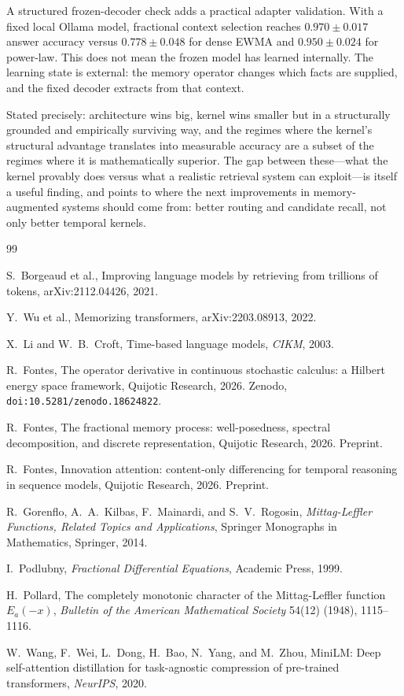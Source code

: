 \documentclass[11pt]{article}
\theoremstyle{plain}
\theoremstyle{definition}
\begin{document}
A structured frozen-decoder check adds a practical
adapter validation.  With a fixed local Ollama model,
fractional context selection reaches $0.970\pm0.017$
answer accuracy versus $0.778\pm0.048$ for dense EWMA
and $0.950\pm0.024$ for power-law.  This does not mean
the frozen model has learned internally.  The learning
state is external: the memory operator changes which
facts are supplied, and the fixed decoder extracts from
that context.

Stated precisely: architecture wins big, kernel wins
smaller but in a structurally grounded and empirically
surviving way, and the regimes where the kernel's
structural advantage translates into measurable accuracy
are a subset of the regimes where it is mathematically
superior.  The gap between these---what the kernel
provably does versus what a realistic retrieval system can
exploit---is itself a useful finding, and points to where
the next improvements in memory-augmented systems should
come from: better routing and candidate recall, not only
better temporal kernels.


\begin{thebibliography}{99}

S.~Borgeaud et al., Improving language models by
retrieving from trillions of tokens,
arXiv:2112.04426, 2021.

Y.~Wu et al., Memorizing transformers,
arXiv:2203.08913, 2022.

X.~Li and W.~B.~Croft, Time-based language models,
\emph{CIKM}, 2003.

R.~Fontes, The operator derivative in continuous
stochastic calculus: a Hilbert energy space
framework, Quijotic Research, 2026.
Zenodo, \texttt{doi:10.5281/zenodo.18624822}.

R.~Fontes, The fractional memory process:
well-posedness, spectral decomposition, and discrete
representation, Quijotic Research, 2026.
Preprint.

R.~Fontes, Innovation attention: content-only
differencing for temporal reasoning in sequence
models, Quijotic Research, 2026.
Preprint.

R.~Gorenflo, A.~A.~Kilbas, F.~Mainardi, and
S.~V.~Rogosin, \emph{Mittag-Leffler Functions,
Related Topics and Applications}, Springer
Monographs in Mathematics, Springer, 2014.

I.~Podlubny, \emph{Fractional Differential
Equations}, Academic Press, 1999.

H.~Pollard, The completely monotonic character of
the Mittag-Leffler function $E_a(-x)$,
\emph{Bulletin of the American Mathematical
Society} 54(12) (1948), 1115--1116.

W.~Wang, F.~Wei, L.~Dong, H.~Bao, N.~Yang, and
M.~Zhou, MiniLM: Deep self-attention distillation
for task-agnostic compression of pre-trained
transformers, \emph{NeurIPS}, 2020.

\end{thebibliography}
\end{document}
